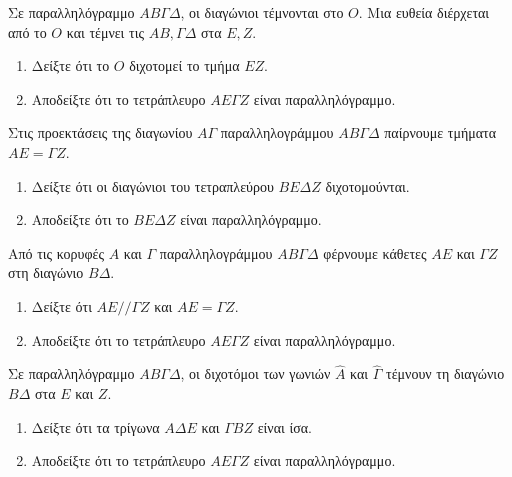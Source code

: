 \documentclass[11pt,a4paper,modern]{FFExercises}
\begin{document}
\askhsh
Σε παραλληλόγραμμο $ΑΒ\varGamma\Delta$, οι διαγώνιοι τέμνονται στο $Ο$. Μια ευθεία διέρχεται από το $Ο$ και τέμνει τις $ΑΒ, \varGamma\Delta$ στα $Ε, Ζ$.
\begin{enumerate}[label=\roman*)]
    \item Δείξτε ότι το $Ο$ διχοτομεί το τμήμα $ΕΖ$.
    \item Αποδείξτε ότι το τετράπλευρο $ΑΕ\varGamma Ζ$ είναι παραλληλόγραμμο.
\end{enumerate}

\askhsh Στις προεκτάσεις της διαγωνίου $Α\varGamma$ παραλληλογράμμου $ΑΒ\varGamma\Delta$ παίρνουμε τμήματα $ΑΕ = \varGamma Ζ$.
\begin{enumerate}[label=\roman*)]
    \item Δείξτε ότι οι διαγώνιοι του τετραπλεύρου $ΒΕ\Delta Ζ$ διχοτομούνται.
    \item Αποδείξτε ότι το $ΒΕ\Delta Ζ$ είναι παραλληλόγραμμο.
\end{enumerate}

\begin{center}
\end{center}

\askhsh Από τις κορυφές $Α$ και $\varGamma$ παραλληλογράμμου $ΑΒ\varGamma\Delta$ φέρνουμε κάθετες $ΑΕ$ και $\varGamma Ζ$ στη διαγώνιο $Β\Delta$.
\begin{enumerate}[label=\roman*)]
    \item Δείξτε ότι $ΑΕ // \varGamma Ζ$ και $ΑΕ = \varGamma Ζ$.
    \item Αποδείξτε ότι το τετράπλευρο $ΑΕ\varGamma Ζ$ είναι παραλληλόγραμμο.
\end{enumerate}

\askhsh Σε παραλληλόγραμμο $ΑΒ\varGamma\Delta$, οι διχοτόμοι των γωνιών $\hat{Α}$ και $\hat{\varGamma}$ τέμνουν τη διαγώνιο $Β\Delta$ στα $Ε$ και $Ζ$.
\begin{enumerate}[label=\roman*)]
    \item Δείξτε ότι τα τρίγωνα $Α\Delta Ε$ και $\varGamma Β Ζ$ είναι ίσα.
    \item Αποδείξτε ότι το τετράπλευρο $ΑΕ\varGamma Ζ$ είναι παραλληλόγραμμο.
\end{enumerate}
\end{document}
